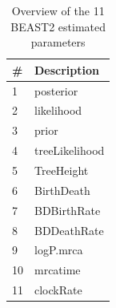\documentclass{article}
\begin{document}
\begin{table}
  \centering 
  \begin{tabular}{l l}
    \hline
    \# & Description \\
    \hline
    \hline
    1 & posterior \\
    2 & likelihood \\
    3 & prior \\
    4 & treeLikelihood \\
    5 & TreeHeight \\
    6 & BirthDeath \\
    7 & BDBirthRate \\
    8 & BDDeathRate \\
    9 & logP.mrca \\
    10 & mrcatime \\
    11 & clockRate \\
    \hline
  \end{tabular}
  \caption{
    Overview of the 11 BEAST2 estimated parameters
  }
  \label{table:estimated_parameters}
\end{table}
\end{document}
